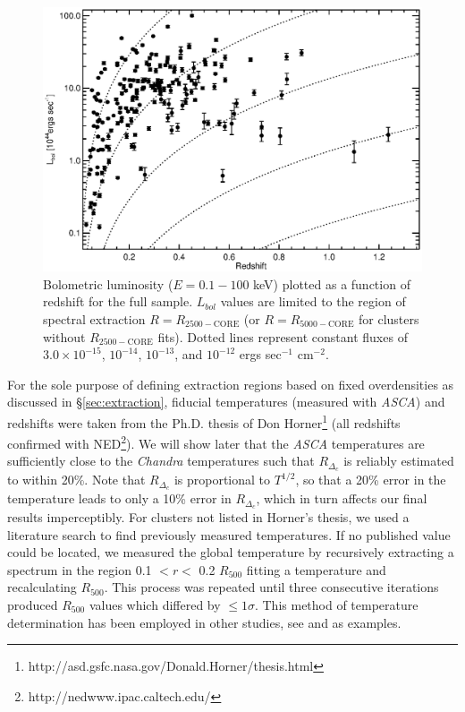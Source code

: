 \documentclass[12pt,preprint]{aastex}
\begin{document}
\begin{figure}
\begin{center}
\includegraphics*[width=\textwidth, trim=0mm 0mm 0mm 0mm, clip]{f1.eps}
\caption{
Bolometric luminosity ($E = 0.1-100$ keV) plotted as a function of
redshift for the full sample. $L_{bol}$ values are limited to the
region of spectral extraction $R=R_{2500-\mathrm{CORE}}$ (or
$R=R_{5000-\mathrm{CORE}}$ for clusters without $R_{2500-\mathrm{CORE}}$
fits). Dotted lines represent constant fluxes of $3.0\times10^{-15}$,
$10^{-14}$, $10^{-13}$, and $10^{-12}$ ergs sec$^{-1}$ cm$^{-2}$.
}
\label{fig:lx_z}
\end{center}
\end{figure}

For the sole purpose of defining extraction regions based on fixed
overdensities as discussed in \S\ref{sec:extraction}, fiducial
temperatures (measured with {\it ASCA}) and redshifts were taken from
the Ph.D. thesis of Don
Horner\footnote{http://asd.gsfc.nasa.gov/Donald.Horner/thesis.html}
(all redshifts confirmed with
NED\footnote{http://nedwww.ipac.caltech.edu/}). We will show later
that the {\it ASCA} temperatures are sufficiently close to the {\it
Chandra} temperatures such that $R_{\Delta_c}$ is reliably estimated
to within 20\%. Note that $R_{\Delta_c}$ is proportional to $T^{1/2}$,
so that a 20\% error in the temperature leads to only a 10\% error in
$R_{\Delta_c}$, which in turn affects our final results
imperceptibly. For clusters not listed in Horner's thesis, we used a
literature search to find previously measured temperatures. If no
published value could be located, we measured the global temperature
by recursively extracting a spectrum in the region 0.1 $< r <$ 0.2
$R_{500}$ fitting a temperature and recalculating $R_{500}$. This
process was repeated until three consecutive iterations produced
$R_{500}$ values which differed by $\leq 1\sigma$. This method of
temperature determination has been employed in other studies, see
\cite{2006MNRAS.tmp.1068S} and \cite{2006ApJS..162..304H} as
examples.
\end{document}
